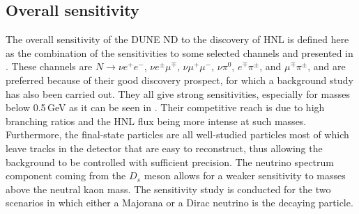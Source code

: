 \subsection{Overall sensitivity}

The overall sensitivity of the DUNE ND to the discovery of HNL is defined here as the combination of the sensitivities %
to some selected channels and presented in .
These channels are $N \to \nu e^+ e^-$, $\nu e^\pm \mu^\mp$, $\nu \mu^+\mu^-$, $\nu\pi^0$, $e^\mp\pi^\pm$, and $\mu^\mp\pi^\pm$, %
and are preferred because of their good discovery prospect, for which a background study has also been carried out.
They all give strong sensitivities, especially for masses below 0.5\,GeV as it can be seen in .
Their competitive reach is due to high branching ratios and the HNL flux being more intense at such masses.
Furthermore, the final-state particles are all well-studied particles most of which leave tracks in the detector %
that are easy to reconstruct, thus allowing the background to be controlled with sufficient precision.
The neutrino spectrum component coming from the $D_s$ meson allows for a weaker sensitivity %
to masses above the neutral kaon mass.
The sensitivity study is conducted for the two scenarios in which either a Majorana or a Dirac neutrino is the decaying particle.

